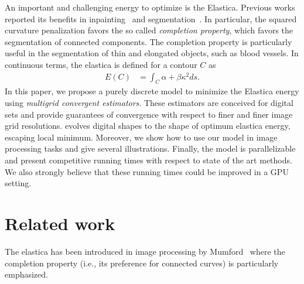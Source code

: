 \documentclass[smallextended]{svjour3}
\begin{document}
An important and challenging energy to optimize is the Elastica. Previous works reported its benefits in inpainting~\cite{masnou98inpainting,ballester01filljoint,chan02elasticainpainting} and segmentation~\cite{goldluecke11totalcurvature,zhu2013image,nieuwenhuis14efficient, antunes20}. In particular, the squared curvature penalization favors the so called \emph{completion property}, which favors the segmentation of connected components. The completion property is particularly useful in the segmentation of thin and elongated objects, such as blood vessels. In continuous terms, the elastica is defined for a contour $C$ as
%
\begin{align*}
	E(C) &= \int_{C}{\alpha + \beta \kappa^2 ds}.
\end{align*}
%
In this paper, we propose a purely discrete model to minimize the Elastica energy using \emph{multigrid convergent estimators}. These estimators are conceived for digital sets and provide guarantees of convergence with respect to finer and finer image grid resolutions.  evolves digital shapes to the shape of optimum elastica energy, escaping local minimum. Moreover, we show how to use our model in image processing tasks and give several illustrations. Finally, the model is parallelizable and present competitive running times with respect to state of the art methods. We also strongly believe that these running times could be improved in a GPU setting.
%
%

\section{Related work}

The elastica has been introduced in image processing by Mumford~\cite{mumford1994elastica} 
where the completion property (i.e., its preference for connected curves) is 
particularly emphasized.
\end{document}
